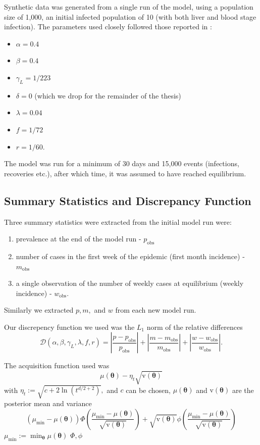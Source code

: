 Synthetic data was generated from a single run of the model, using a population
size of 1,000, an initial infected population of 10 (with both liver and blood
stage infection). The parameters used closely followed those reported in 
\cite{champagne_using_2022}: \begin{itemize}
    \item $\alpha = 0.4$
    \item $\beta = 0.4$
    \item $\gamma_L = 1 / 223$
    \item $\delta = 0$ (which we drop for the remainder of the thesis)
    \item $\lambda = 0.04$
    \item $f = 1 / 72 $
    \item $r = 1 / 60.$
\end{itemize}
The model was run for a minimum of 30 days and 15,000 events
(infections, recoveries etc.), after which time, it was assumed to have reached
equilibrium.

\subsection*{Summary Statistics and Discrepancy Function} 

Three summary statistics were extracted from the initial model run were:
\begin{enumerate}
    \item prevalence at the end of the model run - $p_\text{obs}$
    \item number of cases in the first week of the epidemic
          (first month incidence) - $m_\text{obs}$
    \item a single observation of the number of weekly cases at equilibrium
          (weekly incidence) - $w_\text{obs}.$
\end{enumerate} Similarly we extracted $p, m,$ and $w$ from each new model run.

Our discrepency function we used was the $L_1$ norm of the relative differences $$\mathcal{D}(\alpha, \beta, \gamma_L, \lambda, f, r) = \left|\frac{p - p_\text{obs}}{p_\text{obs}}\right| + \left|\frac{m - m_\text{obs}}{m_\text{obs}}\right| + \left|\frac{w - w_\text{obs}}{w_\text{obs}}\right|.$$



The acquisition function used was $$\mu(\bm\theta) - \eta_t\sqrt{\mathrm{v}(\bm\theta)}$$ with $\eta_t:= \sqrt{c + 2\ln(t^{d/2 + 2})},$ and $c$ can be chosen, $\mu(\bm\theta)$ and $\mathrm{v}(\bm\theta)$ are the posterior mean and variance
$$(\mu_\text{min} - \mu(\bm\theta))
\varPhi\left(\frac{\mu_\text{min} - \mu(\bm\theta)}{\sqrt{\mathrm{v}(\bm\theta)}}\right) + \sqrt{\mathrm{v}(\bm\theta)}
\phi\left(\frac{\mu_\text{min} - \mu(\bm\theta)}{\sqrt{\mathrm{v}(\bm\theta)}}\right)$$
$\mu_\text{min} := \min_{\bm{\theta}} \mu(\bm\theta)$
$\varPhi, \phi$ 

